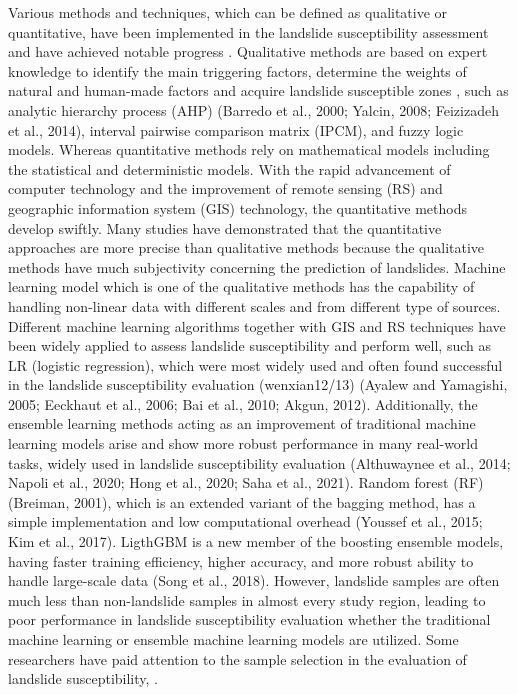 \documentclass[a4paper,fleqn]{cas-sc}
\begin{document}
Various methods and techniques, which can be defined as qualitative or quantitative, have been implemented in the landslide susceptibility assessment and have achieved notable progress \citep{Fang2020IJoGIS,Guzzetti_1999_Geomorphology,Bui2020Catena}. 
Qualitative methods are based on expert knowledge to identify the main triggering factors, determine the weights of natural and human-made factors and acquire landslide susceptible zones \citep{Aditian2018Geomorphology}, such as analytic hierarchy process (AHP) (Barredo et al., 2000; Yalcin, 2008; Feizizadeh et al., 2014)\citep{Barredo2000IJoAEOaG,Yalcin2008Catena}, interval pairwise comparison matrix (IPCM)\citep{Ghorbanzadeh2019RemoteSensing}, and fuzzy logic models\citep{Aksoy2012Computers&Geosciences,Anbalagan2015GeoenvironmentalDisasters,Shahabi2015EnvironmentalEarthSciences,Roy2019RemoteSensingApplicationsSocietyandEnvironment}. 
Whereas quantitative methods rely on mathematical models including the statistical and deterministic models\citep{Abuzied2016JoMS, Reichenbach2018ER,Fang2020IJoGIS}. 
With the rapid advancement of computer technology and the improvement of remote sensing (RS) and geographic information system (GIS) technology, the quantitative methods develop swiftly. 
Many studies have demonstrated that the quantitative approaches are more precise than qualitative methods because the qualitative methods have much subjectivity concerning the prediction of landslides\citep{Aditian2018Geomorphology, Bui2020Catena}. 
Machine learning model which is one of the qualitative methods has the capability of handling non-linear data with different scales and from different type of sources\citep{Bui2020Catena}. 
Different machine learning algorithms together with GIS and RS techniques have been widely applied to assess landslide susceptibility and perform well, such as LR (logistic regression), which were most widely used and often found successful in the landslide susceptibility evaluation (wenxian12/13) (Ayalew and Yamagishi, 2005; Eeckhaut et al., 2006; Bai et al., 2010; Akgun, 2012)\citep{2019Sevgenp39403940}. 
Additionally, the ensemble learning methods acting as an improvement of traditional machine learning models arise and show more robust performance in many real-world tasks, widely used in landslide susceptibility evaluation (Althuwaynee et al., 2014; Napoli et al., 2020; Hong et al., 2020; Saha et al., 2021). 
Random forest (RF) (Breiman, 2001), which is an extended variant of the bagging method, has a simple implementation and low computational overhead (Youssef et al., 2015; Kim et al., 2017). LigthGBM is a new member of the boosting ensemble models, having faster training efficiency, higher accuracy, and more robust ability to handle large-scale data (Song et al., 2018). 
However, landslide samples are often much less than non-landslide samples in almost every study region, leading to poor performance in landslide susceptibility evaluation whether the traditional machine learning or ensemble machine learning models are utilized.
Some researchers have paid attention to the sample selection in the evaluation of landslide susceptibility, \citep{Ada2017NH,San2014IJoAEOaG,Nefeslioglu2012IJoAEOaG}.
\end{document}
